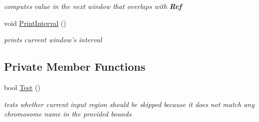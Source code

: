 \begin{CompactItemize}
\begin{CompactList}\small\item\em computes value in the next window that overlaps with {\bf Ref} \item\end{CompactList}\item 
\hypertarget{classGenomicRegionSetScanner_e494d96f93477902ca339516906bb6da}{
void \hyperlink{classGenomicRegionSetScanner_e494d96f93477902ca339516906bb6da}{PrintInterval} ()}
\label{classGenomicRegionSetScanner_e494d96f93477902ca339516906bb6da}

\begin{CompactList}\small\item\em prints current window's interval \item\end{CompactList}\end{CompactItemize}
\subsection*{Private Member Functions}
\begin{CompactItemize}
\item 
\hypertarget{classGenomicRegionSetScanner_2687f9ec4d1fac4856f6fd8bf823b65d}{
bool \hyperlink{classGenomicRegionSetScanner_2687f9ec4d1fac4856f6fd8bf823b65d}{Test} ()}
\label{classGenomicRegionSetScanner_2687f9ec4d1fac4856f6fd8bf823b65d}

\begin{CompactList}\small\item\em tests whether current input region should be skipped because it does not match any chromosome name in the provided bounds \item\end{CompactList}\end{CompactItemize}

